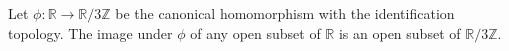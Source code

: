 Let $\phi: \mathbb{R} \to \mathbb{R}/3\mathbb{Z}$ be the canonical homomorphism with the identification topology. The image under $\phi$ of any open subset of $\mathbb{R}$ is an open subset of $\mathbb{R}/3\mathbb{Z}$.
